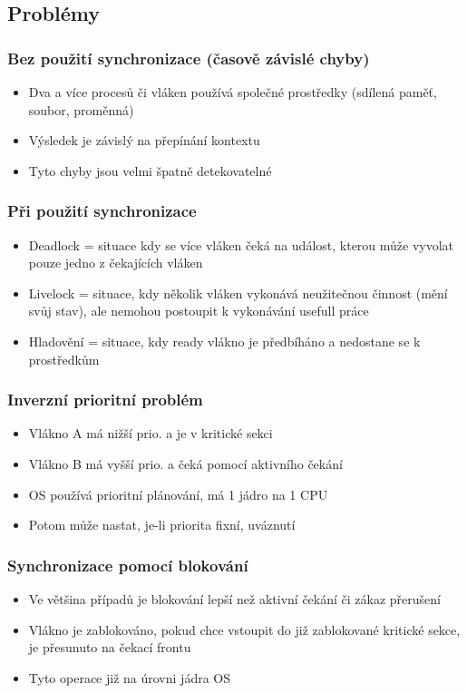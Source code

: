 \documentclass{szzclass}
\begin{document}
\subsection{Problémy}

\subsubsection{Bez použití synchronizace (časově závislé chyby)}
\begin{itemize}
    \item Dva a více procesů či vláken používá společné prostředky (sdílená paměť, soubor, proměnná)
    \item Výsledek je závislý na přepínání kontextu
    \item Tyto chyby jsou velmi špatně detekovatelné
\end{itemize}


\subsubsection{Při použití synchronizace}
\begin{itemize}
    \item Deadlock = situace kdy se více vláken čeká na událost, kterou může vyvolat pouze jedno z čekajících vláken
    \item Livelock = situace, kdy několik vláken vykonává neužitečnou činnost (mění svůj stav), ale nemohou postoupit k vykonávání usefull práce
    \item Hladovění = situace, kdy ready vlákno je předbíháno a nedostane se k prostředkům
\end{itemize}

\subsubsection{Inverzní prioritní problém}

\begin{itemize}
\item Vlákno A má nižší prio. a je v kritické sekci
\item Vlákno B má vyšší prio. a čeká pomocí aktivního čekání
\item OS používá prioritní plánování, má 1 jádro na 1 CPU
\item Potom může nastat, je-li priorita fixní, uváznutí
\end{itemize}

\subsubsection{Synchronizace pomocí blokování}
\begin{itemize}
\item Ve většina případů je blokování lepší než aktivní čekání či zákaz přerušení
\item Vlákno je zablokováno, pokud chce vstoupit do již zablokované kritické sekce, je přesunuto na čekací frontu
\item Tyto operace již na úrovni jádra OS
\end{itemize}
\end{document}
